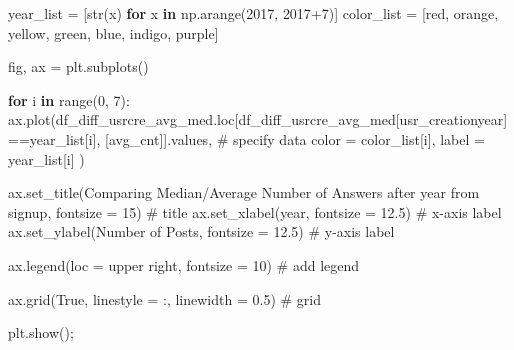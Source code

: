 \documentclass[
  letterpaper,
  DIV=11,
  numbers=noendperiod]{scrartcl}
\newenvironment{Shaded}{\begin{snugshade}}{\end{snugshade}}
\newcommand{\BuiltInTok}[1]{\textcolor[rgb]{0.00,0.23,0.31}{#1}}
\newcommand{\CommentTok}[1]{\textcolor[rgb]{0.37,0.37,0.37}{#1}}
\newcommand{\ControlFlowTok}[1]{\textcolor[rgb]{0.00,0.23,0.31}{\textbf{#1}}}
\newcommand{\DecValTok}[1]{\textcolor[rgb]{0.68,0.00,0.00}{#1}}
\newcommand{\FloatTok}[1]{\textcolor[rgb]{0.68,0.00,0.00}{#1}}
\newcommand{\KeywordTok}[1]{\textcolor[rgb]{0.00,0.23,0.31}{\textbf{#1}}}
\newcommand{\NormalTok}[1]{\textcolor[rgb]{0.00,0.23,0.31}{#1}}
\newcommand{\OperatorTok}[1]{\textcolor[rgb]{0.37,0.37,0.37}{#1}}
\newcommand{\StringTok}[1]{\textcolor[rgb]{0.13,0.47,0.30}{#1}}
\newcommand{\VariableTok}[1]{\textcolor[rgb]{0.07,0.07,0.07}{#1}}
\begin{document}
\begin{Shaded}
\begin{Highlighting}[]
\NormalTok{year\_list }\OperatorTok{=}\NormalTok{ [}\BuiltInTok{str}\NormalTok{(x) }\ControlFlowTok{for}\NormalTok{ x }\KeywordTok{in}\NormalTok{ np.arange(}\DecValTok{2017}\NormalTok{, }\DecValTok{2017}\OperatorTok{+}\DecValTok{7}\NormalTok{)]}
\NormalTok{color\_list }\OperatorTok{=}\NormalTok{ [}\StringTok{\textquotesingle{}red\textquotesingle{}}\NormalTok{, }\StringTok{\textquotesingle{}orange\textquotesingle{}}\NormalTok{, }\StringTok{\textquotesingle{}yellow\textquotesingle{}}\NormalTok{, }\StringTok{\textquotesingle{}green\textquotesingle{}}\NormalTok{, }\StringTok{\textquotesingle{}blue\textquotesingle{}}\NormalTok{, }\StringTok{\textquotesingle{}indigo\textquotesingle{}}\NormalTok{, }\StringTok{\textquotesingle{}purple\textquotesingle{}}\NormalTok{]}

\NormalTok{fig, ax }\OperatorTok{=}\NormalTok{ plt.subplots()}

\ControlFlowTok{for}\NormalTok{ i }\KeywordTok{in} \BuiltInTok{range}\NormalTok{(}\DecValTok{0}\NormalTok{, }\DecValTok{7}\NormalTok{):    }
\NormalTok{        ax.plot(df\_diff\_usrcre\_avg\_med.loc[df\_diff\_usrcre\_avg\_med[}\StringTok{\textquotesingle{}usr\_creationyear\textquotesingle{}}\NormalTok{]}\OperatorTok{==}\NormalTok{year\_list[i], [}\StringTok{\textquotesingle{}avg\_cnt\textquotesingle{}}\NormalTok{]].values, }\CommentTok{\# specify data}
\NormalTok{                color }\OperatorTok{=}\NormalTok{ color\_list[i],}
\NormalTok{                label }\OperatorTok{=}\NormalTok{ year\_list[i]}
\NormalTok{        ) }

\NormalTok{ax.set\_title(}\StringTok{\textquotesingle{}Comparing Median/Average Number of Answers after year from signup\textquotesingle{}}\NormalTok{, fontsize }\OperatorTok{=} \DecValTok{15}\NormalTok{) }\CommentTok{\# title}
\NormalTok{ax.set\_xlabel(}\StringTok{\textquotesingle{}year\textquotesingle{}}\NormalTok{, fontsize }\OperatorTok{=} \FloatTok{12.5}\NormalTok{) }\CommentTok{\# x{-}axis label}
\NormalTok{ax.set\_ylabel(}\StringTok{\textquotesingle{}Number of Posts\textquotesingle{}}\NormalTok{, fontsize }\OperatorTok{=} \FloatTok{12.5}\NormalTok{) }\CommentTok{\# y{-}axis label}

\NormalTok{ax.legend(loc }\OperatorTok{=} \StringTok{\textquotesingle{}upper right\textquotesingle{}}\NormalTok{, fontsize }\OperatorTok{=} \DecValTok{10}\NormalTok{) }\CommentTok{\# add legend}

\NormalTok{ax.grid(}\VariableTok{True}\NormalTok{, linestyle }\OperatorTok{=} \StringTok{\textquotesingle{}:\textquotesingle{}}\NormalTok{, linewidth }\OperatorTok{=} \FloatTok{0.5}\NormalTok{) }\CommentTok{\# grid}

\NormalTok{plt.show()}\OperatorTok{;}
\end{Highlighting}
\end{Shaded}
\end{document}
